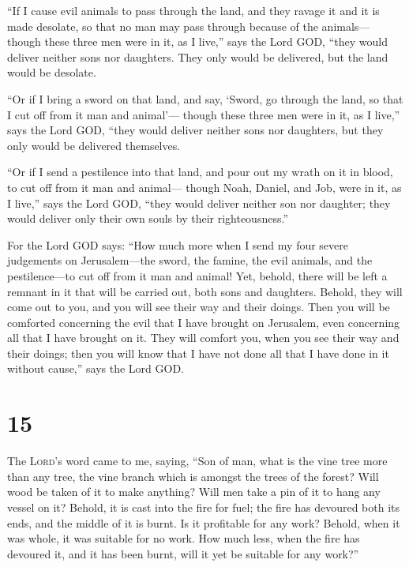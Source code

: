  ``If I cause evil animals to pass through the land, and
they ravage it and it is made desolate, so that no man may pass through
because of the animals---  though these three men were in
it, as I live,'' says the Lord GOD, ``they would deliver neither sons
nor daughters. They only would be delivered, but the land would be
desolate.

 ``Or if I bring a sword on that land, and say, `Sword,
go through the land, so that I cut off from it man and animal'---
 though these three men were in it, as I live,'' says the
Lord GOD, ``they would deliver neither sons nor daughters, but they only
would be delivered themselves.

 ``Or if I send a pestilence into that land, and pour out
my wrath on it in blood, to cut off from it man and animal---
 though Noah, Daniel, and Job, were in it, as I live,''
says the Lord GOD, ``they would deliver neither son nor daughter; they
would deliver only their own souls by their righteousness.''

 For the Lord GOD says: ``How much more when I send my
four severe judgements on Jerusalem---the sword, the famine, the evil
animals, and the pestilence---to cut off from it man and animal!
 Yet, behold, there will be left a remnant in it that
will be carried out, both sons and daughters. Behold, they will come out
to you, and you will see their way and their doings. Then you will be
comforted concerning the evil that I have brought on Jerusalem, even
concerning all that I have brought on it.  They will
comfort you, when you see their way and their doings; then you will know
that I have not done all that I have done in it without cause,'' says
the Lord GOD.

\hypertarget{section-14}{%
\section{15}\label{section-14}}

 The \textsc{Lord}'s word came to me, saying,
 ``Son of man, what is the vine tree more than any tree,
the vine branch which is amongst the trees of the forest? 
Will wood be taken of it to make anything? Will men take a pin of it to
hang any vessel on it?  Behold, it is cast into the fire
for fuel; the fire has devoured both its ends, and the middle of it is
burnt. Is it profitable for any work?  Behold, when it was
whole, it was suitable for no work. How much less, when the fire has
devoured it, and it has been burnt, will it yet be suitable for any
work?''

